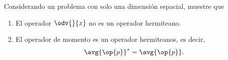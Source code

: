 \documentclass[../main.tex]{subfiles}
\begin{document}
\begin{problema}
	Considerando un problema con solo una dimensión espacial, muestre que

	\begin{enumerate}
		\item El operador \(\odv{}{x}\) no es un operador hermiteano.
		\item El operador de momento es un operador hermiteanos, es decir,
		      \begin{equation*}
			      \avg{\op{p}}^{*} = \avg{\op{p}}.
		      \end{equation*}
	\end{enumerate}
\end{problema}
\end{document}
